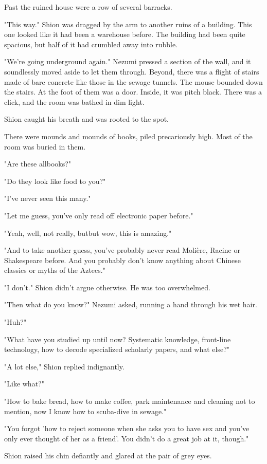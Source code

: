 Past the ruined house were a row of several barracks.

"This way." Shion was dragged by the arm to another ruins of a building.
This one looked like it had been a warehouse before. The building had
been quite spacious, but half of it had crumbled away into rubble.

"We're going underground again." Nezumi pressed a section of the wall,
and it soundlessly moved aside to let them through. Beyond, there was a
flight of stairs made of bare concrete like those in the sewage tunnels.
The mouse bounded down the stairs. At the foot of them was a door.
Inside, it was pitch black. There was a click, and the room was bathed
in dim light.

Shion caught his breath and was rooted to the spot.

There were mounds and mounds of books, piled precariously high. Most of
the room was buried in them.

"Are these all\el books?"

"Do they look like food to you?"

"I've never seen this many."

"Let me guess, you've only read off electronic paper before."

"Yeah, well, not really, but\el but wow, this is amazing."

"And to take another guess, you've probably never read Molière, Racine
or Shakespeare before. And you probably don't know anything about
Chinese classics or myths of the Aztecs."

"I don't." Shion didn't argue otherwise. He was too overwhelmed.

"Then what do you know?" Nezumi asked, running a hand through his wet
hair.

"Huh?"

"What have you studied up until now? Systematic knowledge, front-line
technology, how to decode specialized scholarly papers, and what else?"

"A lot else," Shion replied indignantly.

"Like what?"

"How to bake bread, how to make coffee, park maintenance and cleaning\el 
not to mention, now I know how to scuba-dive in sewage."

"You forgot 'how to reject someone when she asks you to have sex and
you've only ever thought of her as a friend'. You didn't do a great job
at it, though."

Shion raised his chin defiantly and glared at the pair of grey eyes.

